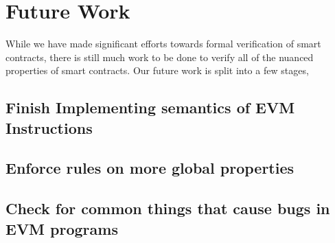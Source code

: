 \section{Future Work}
While we have made significant efforts towards formal verification of smart
contracts, there is still much work to be done to verify all of the nuanced properties
of smart contracts. Our future work is split into a few stages,

\subsection{Finish Implementing semantics of EVM Instructions}
\subsection{Enforce rules on more global properties}
\subsection{Check for common things that cause bugs in EVM programs}
